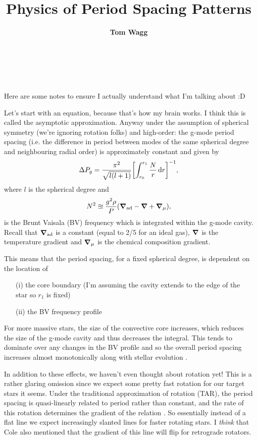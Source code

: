 \documentclass[12pt]{article}
\title{Physics of Period Spacing Patterns}
\author{\textbf{Tom Wagg}}
\newcommand{\tomtitle}{
    \noindent {\LARGE \fontfamily{cmr}\selectfont \textbf{\thetitle}} \hfill \\[1\baselineskip]
    \noindent {\large \fontfamily{cmr}\selectfont Kavli Summer Program \hfill \textsc{Tom Wagg}}\\[0.5\baselineskip]
}
\begin{document}
\tomtitle{}

\thispagestyle{empty}

Here are some notes to ensure I actually understand what I'm talking about :D

Let's start with an equation, because that's how my brain works. I think this is called the asymptotic approximation. Anyway under the assumption of spherical symmetry (we're ignoring rotation folks) and high-order: the g-mode period spacing (i.e. the difference in period between modes of the same spherical degree and neighbouring radial order) is approximately constant and given by \citep[e.g.,][]{Hatta+2023}
\begin{equation}
    \Delta P_g = \frac{\pi^2}{\sqrt{l(l+1)}} \qty[\int_{r_0}^{r_1} \frac{N}{r} \dd{r}]^{-1},
\end{equation}
where $l$ is the spherical degree and
\begin{equation}
    N^2 \approxeq \frac{g^2 \rho}{P} \qty(\grad_{\rm ad} - \grad + \grad_\mu),
\end{equation}
is the Brunt Vaisala (BV) frequency which is integrated within the g-mode cavity. Recall that $\grad_{\rm ad}$ is a constant (equal to 2/5 for an ideal gas), $\grad$ is the temperature gradient and $\grad_\mu$ is the chemical composition gradient.

This means that the period spacing, for a fixed spherical degree, is dependent on the location of
\begin{itemize}
    \item[(i)] the core boundary (I'm assuming the cavity extends to the edge of the star so $r_1$ is fixed)
    \item[(ii)] the BV frequency profile
\end{itemize}
For more massive stars, the size of the convective core increases, which reduces the size of the g-mode cavity and thus decreases the integral. This tends to dominate over any changes in the BV profile and so the overall period spacing increases almost monotonically along with stellar evolution \citep{Miglio+2008}.

In addition to these effects, we haven't even thought about rotation yet! This is a rather glaring omission since we expect some pretty fast rotation for our target stars it seems. Under the traditional approximation of rotation (TAR), the period spacing is quasi-linearly related to period rather than constant, and the rate of this rotation determines the gradient of the relation \citep{Bouabid+2013}. So essentially instead of a flat line we expect increasingly slanted lines for faster rotating stars. I \textit{think} that Cole also mentioned that the gradient of this line will flip for retrograde rotators.



\end{document}
